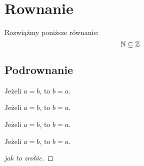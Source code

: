 
\section{Rownanie}
Rozwiążmy poniższe równanie:
\[
  \mathbb{N} \subseteq \mathbb{Z}
\]

\subsection{Podrownanie}

\begin{definition}
  Jeżeli $a = b$, to $b = a$.
\end{definition}

\begin{theorem}
  Jeżeli $a = b$, to $b = a$.
\end{theorem}

\begin{example}
  Jeżeli $a = b$, to $b = a$.
\end{example}

\begin{lemma}
  Jeżeli $a = b$, to $b = a$.
\end{lemma}

\begin{proof}[jak to zrobic]
  \textsection
\end{proof}
